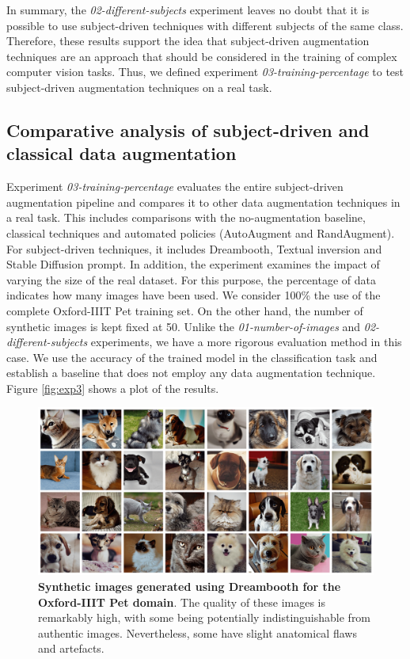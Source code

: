 In summary, the \textit{02-different-subjects} experiment leaves no doubt that it is possible to use subject-driven techniques with different subjects of the same class. Therefore, these results support the idea that subject-driven augmentation techniques are an approach that should be considered in the training of complex computer vision tasks. Thus, we defined experiment \textit{03-training-percentage} to test subject-driven augmentation techniques on a real task.

\subsection{Comparative analysis of subject-driven and classical data augmentation} \label{sec: exp-03}

Experiment \textit{03-training-percentage} evaluates the entire subject-driven augmentation pipeline and compares it to other data augmentation techniques in a real task. This includes comparisons with the no-augmentation baseline, classical techniques and automated policies (AutoAugment and RandAugment). For subject-driven techniques, it includes Dreambooth, Textual inversion and Stable Diffusion prompt. In addition, the experiment examines the impact of varying the size of the real dataset. For this purpose, the percentage of data indicates how many images have been used. We consider 100\% the use of the complete Oxford-IIIT Pet training set. On the other hand, the number of synthetic images is kept fixed at 50. Unlike the \textit{01-number-of-images} and \textit{02-different-subjects} experiments, we have a more rigorous evaluation method in this case. We use the accuracy of the trained model in the classification task and establish a baseline that does not employ any data augmentation technique. Figure \ref{fig:exp3} shows a plot of the results. 

\begin{figure}
    \centering
    \includegraphics[width=1\textwidth]{Pictures/dreambooth-img.png} 
    \caption{\textbf{Synthetic images generated using Dreambooth for the Oxford-IIIT Pet domain}. The quality of these images is remarkably high, with some being potentially indistinguishable from authentic images. Nevertheless, some have slight anatomical flaws and artefacts.}
    \label{fig:exp3-images-dream}
\end{figure}

